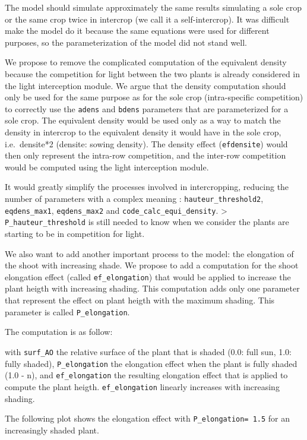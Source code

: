 \documentclass[
]{book}
\begin{document}
The model should simulate approximately the same results simulating a sole crop or the same crop twice in intercrop (we call it a self-intercrop). It was difficult make the model do it because the same equations were used for different purposes, so the parameterization of the model did not stand well.

We propose to remove the complicated computation of the equivalent density because the competition for light between the two plants is already considered in the light interception module. We argue that the density computation should only be used for the same purpose as for the sole crop (intra-specific competition) to correctly use the \texttt{adens} and \texttt{bdens} parameters that are parameterized for a sole crop. The equivalent density would be used only as a way to match the density in intercrop to the equivalent density it would have in the sole crop, i.e.~densite*2 (densite: sowing density). The density effect (\texttt{efdensite}) would then only represent the intra-row competition, and the inter-row competition would be computed using the light interception module.

It would greatly simplify the processes involved in intercropping, reducing the number of parameters with a complex meaning : \texttt{hauteur\_threshold2}, \texttt{eqdens\_max1}, \texttt{eqdens\_max2} and \texttt{code\_calc\_equi\_density}.
\textgreater{} \texttt{P\_hauteur\_threshold} is still needed to know when we consider the plants are starting to be in competition for light.

We also want to add another important process to the model: the elongation of the shoot with increasing shade. We propose to add a computation for the shoot elongation effect (called \texttt{ef\_elongation}) that would be applied to increase the plant heigth with increasing shading. This computation adds only one parameter that represent the effect on plant heigth with the maximum shading. This parameter is called \texttt{P\_elongation}.

The computation is as follow:

with \texttt{surf\_AO} the relative surface of the plant that is shaded (0.0: full sun, 1.0: fully shaded), \texttt{P\_elongation} the elongation effect when the plant is fully shaded (1.0 - n), and \texttt{ef\_elongation} the resulting elongation effect that is applied to compute the plant heigth. \texttt{ef\_elongation} linearly increases with increasing shading.

The following plot shows the elongation effect with \texttt{P\_elongation=\ 1.5} for an increasingly shaded plant.
\end{document}
